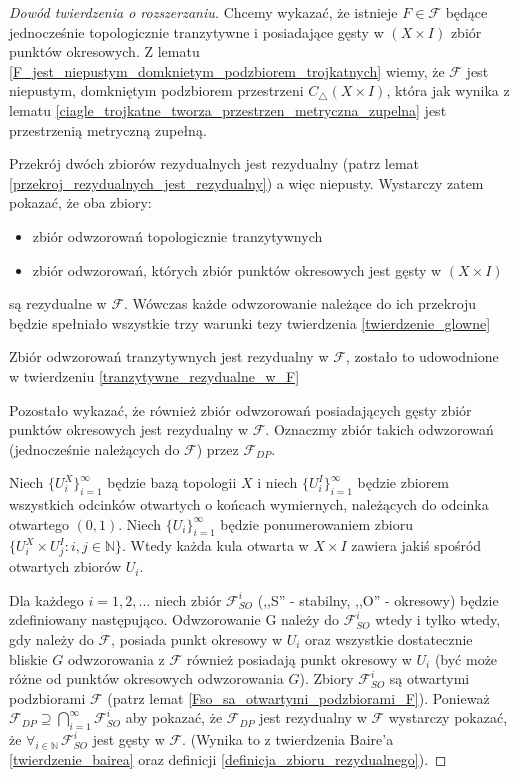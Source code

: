 \documentclass[licencjacka]{pwr_wmat_praca_dyplomowa}
\theoremstyle{plain}
\numberwithin{theorem}{chapter}
\theoremstyle{definition}
\numberwithin{theorem}{chapter}
\begin{document}
\begin{proof}[Dowód twierdzenia o rozszerzaniu]
Chcemy wykazać, że istnieje $F \in \mathcal{F}$ będące jednocześnie topologicznie tranzytywne i posiadające gęsty w $(X \times I)$ zbiór punktów okresowych. Z lematu \ref{F_jest_niepustym_domknietym_podzbiorem_trojkatnych} wiemy, że $\mathcal{F}$ jest niepustym, domkniętym podzbiorem przestrzeni $C_{\triangle}(X \times I)$, która jak wynika z lematu \ref{ciagle_trojkatne_tworza_przestrzen_metryczna_zupelna} jest przestrzenią metryczną zupełną. 

Przekrój dwóch zbiorów rezydualnych jest rezydualny (patrz lemat \ref{przekroj_rezydualnych_jest_rezydualny}) a więc niepusty. Wystarczy zatem pokazać, że oba zbiory:
\begin{itemize}
\item zbiór odwzorowań topologicznie tranzytywnych
\item zbiór odwzorowań, których zbiór punktów okresowych jest gęsty w $(X \times I)$
\end{itemize}
są rezydualne w $\mathcal{F}$. Wówczas każde odwzorowanie należące do ich przekroju będzie spełniało wszystkie trzy warunki tezy twierdzenia \ref{twierdzenie_glowne} 

Zbiór odwzorowań tranzytywnych jest rezydualny w $\mathcal{F}$, zostało to udowodnione w twierdzeniu \ref{tranzytywne_rezydualne_w_F}

Pozostało wykazać, że również zbiór odwzorowań posiadających gęsty zbiór punktów okresowych jest rezydualny w $\mathcal{F}$.
Oznaczmy zbiór takich odwzorowań (jednocześnie należących do $\mathcal{F}$) przez $\mathcal{F}_{DP}$.

Niech $\{U_i^X\}_{i=1}^{\infty}$ będzie bazą topologii $X$ i niech $\{U_i^I\}_{i=1}^{\infty}$ będzie zbiorem wszystkich odcinków otwartych o końcach wymiernych, należących do odcinka otwartego $(0, 1)$. Niech $\{U_i\}_{i=1}^{\infty}$ będzie ponumerowaniem zbioru $\{U_i^X \times U_j^I : i,j \in \mathbb{N}\}$. Wtedy każda kula otwarta w $X \times I$ zawiera jakiś spośród otwartych zbiorów $U_i$.

Dla każdego $i=1,2,...$ niech zbiór $\mathcal{F}_{SO}^i$ (,,S'' - stabilny, ,,O'' - okresowy) będzie zdefiniowany następująco. Odwzorowanie G należy do $\mathcal{F}_{SO}^i$ wtedy i tylko wtedy, gdy należy do $\mathcal{F}$, posiada punkt okresowy w $U_i$ oraz wszystkie dostatecznie bliskie $G$ odwzorowania z $\mathcal{F}$ również posiadają punkt okresowy w $U_i$ (być może różne od punktów okresowych odwzorowania $G$). Zbiory $\mathcal{F}_{SO}^i$ są otwartymi podzbiorami $\mathcal{F}$ (patrz lemat \ref{Fso_sa_otwartymi_podzbiorami_F}). Ponieważ $\mathcal{F}_{DP} \supseteq \bigcap_{i=1}^{\infty} \mathcal{F}_{SO}^i$ aby pokazać, że $\mathcal{F}_{DP}$ jest rezydualny w $\mathcal{F}$ wystarczy pokazać, że $\forall_{i \in \mathbb{N}} \, \mathcal{F}_{SO}^i$ jest gęsty w $\mathcal{F}$. (Wynika to z twierdzenia Baire'a \ref{twierdzenie_bairea} oraz definicji \ref{definicja_zbioru_rezydualnego}).


\end{proof}
\end{document}
